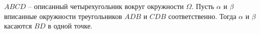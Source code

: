 \documentclass[14pt]{extarticle}
\begin{document}
\(ABCD\) -- описанный четырехугольник вокруг окружности \(\Omega\).
Пусть \(\alpha\) и \(\beta\) вписанные окружности треугольников 
\(ADB\) и \(CDB\) соответственно. Тогда \(\alpha\) и \(\beta\) касаются 
\(BD\) в одной точке.
\end{document}
